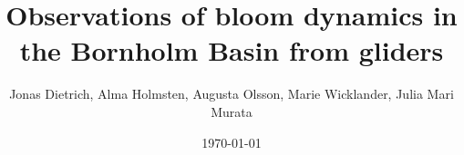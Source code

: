\documentclass{article}
\title{Observations of bloom dynamics in the Bornholm Basin from gliders}
\author{Jonas Dietrich, Alma Holmsten, Augusta Olsson, Marie Wicklander, Julia Mari Murata}
\date{\today}
\begin{document}
\maketitle


\begin{multicols}{2}
% 



% 
\end{multicols}

%
\end{document}
